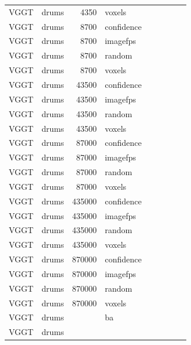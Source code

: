 \begin{table}[H]
\begin{tabular}{llrlrrrrr}
VGGT & drums & 4350 & voxels &  &  &  &  &  \\
VGGT & drums & 8700 & confidence &  &  &  &  &  \\
VGGT & drums & 8700 & imagefps &  &  &  &  &  \\
VGGT & drums & 8700 & random &  &  &  &  &  \\
VGGT & drums & 8700 & voxels &  &  &  &  &  \\
VGGT & drums & 43500 & confidence &  &  &  &  &  \\
VGGT & drums & 43500 & imagefps &  &  &  &  &  \\
VGGT & drums & 43500 & random &  &  &  &  &  \\
VGGT & drums & 43500 & voxels &  &  &  &  &  \\
VGGT & drums & 87000 & confidence &  &  &  &  &  \\
VGGT & drums & 87000 & imagefps &  &  &  &  &  \\
VGGT & drums & 87000 & random &  &  &  &  &  \\
VGGT & drums & 87000 & voxels &  &  &  &  &  \\
VGGT & drums & 435000 & confidence &  &  &  &  &  \\
VGGT & drums & 435000 & imagefps &  &  &  &  &  \\
VGGT & drums & 435000 & random &  &  &  &  &  \\
VGGT & drums & 435000 & voxels &  &  &  &  &  \\
VGGT & drums & 870000 & confidence &  &  &  &  &  \\
VGGT & drums & 870000 & imagefps &  &  &  &  &  \\
VGGT & drums & 870000 & random &  &  &  &  &  \\
VGGT & drums & 870000 & voxels &  &  &  &  &  \\
VGGT & drums &  & ba &  &  &  &  &  \\
VGGT & drums &  &  &  &  &  &  &  \\
\bottomrule
\end{tabular}
\end{table}